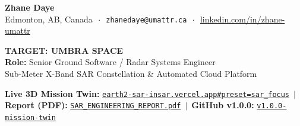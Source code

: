 \documentclass[10pt,letterpaper]{article}
\begin{document}
\begin{tcolorbox}[colframe=umbrablack,colback=umbrablack,coltext=white,boxrule=0pt,top=6pt,bottom=6pt]
\begin{minipage}[c]{0.58\textwidth}
    {\Large\textbf{Zhane Daye}} \\[2pt]
    {\footnotesize Edmonton, AB, Canada $\,\cdot\,$ \texttt{zhanedaye@umattr.ca} $\,\cdot\,$ \href{https://www.linkedin.com/in/zhane-umattr}{linkedin.com/in/zhane-umattr}}
\end{minipage}
\hfill
\begin{minipage}[c]{0.40\textwidth}
    \raggedleft
    {\large\textbf{TARGET: UMBRA SPACE}}\\[1pt]
    {\footnotesize\textbf{Role:} Senior Ground Software / Radar Systems Engineer}\\[1pt]
    {\scriptsize Sub-Meter X-Band SAR Constellation \& Automated Cloud Platform}
\end{minipage}
\end{tcolorbox}

\vspace{-4pt}

\begin{tcolorbox}[colframe=bordergray,colback=lightbg,top=3pt,bottom=3pt]
\footnotesize
\textbf{Live 3D Mission Twin:} \href{https://earth2-sar-insar.vercel.app#preset=sar_focus&stage=v3}{\texttt{earth2-sar-insar.vercel.app\#preset=sar\_focus}} $\,\vert\,$ 
\textbf{Report (PDF):} \href{https://earth2-sar-insar.vercel.app/reports/EARTH2_X_BAND_SAR_INSAR_ENGINEERING_REPORT.pdf}{\texttt{SAR\_ENGINEERING\_REPORT.pdf}} $\,\vert\,$ 
\textbf{GitHub v1.0.0:} \href{https://github.com/zrt219/earth2studio/releases/tag/v1.0.0-mission-twin}{\texttt{v1.0.0-mission-twin}}
\end{tcolorbox}

\vspace{-4pt}
\end{document}
